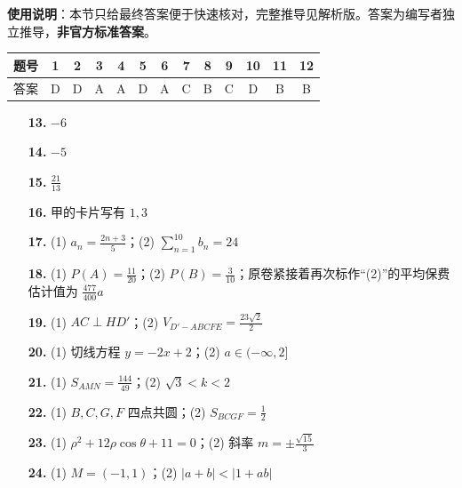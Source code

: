 
\begin{gknotice}
\textbf{使用说明}：本节只给最终答案便于快速核对，完整推导见解析版。答案为编写者独立推导，\textbf{非官方标准答案}。
\end{gknotice}

\begin{center}\begin{tabular}{ccccccccccccc}
\toprule
题号 & 1 & 2 & 3 & 4 & 5 & 6 & 7 & 8 & 9 & 10 & 11 & 12 \\
\midrule
答案 & D & D & A & A & D & A & C & B & C & D & B & B \\
\bottomrule
\end{tabular}\end{center}

\begin{itemize}[leftmargin=2.6em]
  \item[\textbf{13.}] \(-6\)
  \item[\textbf{14.}] \(-5\)
  \item[\textbf{15.}] \(\frac{21}{13}\)
  \item[\textbf{16.}] 甲的卡片写有 \(1,3\)
\end{itemize}

\begin{itemize}[leftmargin=2.6em]
  \item[\textbf{17.}] (1) \(a_n=\frac{2n+3}{5}\)；(2) \(\sum_{n=1}^{10}b_n=24\)
  \item[\textbf{18.}] (1) \(P(A)=\frac{11}{20}\)；(2) \(P(B)=\frac3{10}\)；原卷紧接着再次标作“(2)”的平均保费估计值为 \(\frac{477}{400}a\)
  \item[\textbf{19.}] (1) \(AC\perp HD'\)；(2) \(V_{D'-ABCFE}=\frac{23\sqrt2}{2}\)
  \item[\textbf{20.}] (1) 切线方程 \(y=-2x+2\)；(2) \(a\in(-\infty,2]\)
  \item[\textbf{21.}] (1) \(S_{AMN}=\frac{144}{49}\)；(2) \(\sqrt3<k<2\)
\end{itemize}

\begin{itemize}[leftmargin=2.6em]
  \item[\textbf{22.}] (1) \(B,C,G,F\) 四点共圆；(2) \(S_{BCGF}=\frac12\)
  \item[\textbf{23.}] (1) \(\rho^2+12\rho\cos\theta+11=0\)；(2) 斜率 \(m=\pm\frac{\sqrt{15}}3\)
  \item[\textbf{24.}] (1) \(M=(-1,1)\)；(2) \(|a+b|<|1+ab|\)
\end{itemize}
